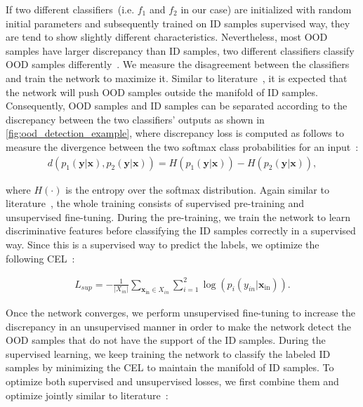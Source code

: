 \hspace*{3.5mm} If two different classifiers~(i.e. $f_{1}$ and $f_{2}$ in our case) are initialized with random initial parameters and subsequently trained on ID samples supervised way, they are tend to show slightly different characteristics. Nevertheless, most OOD samples have larger discrepancy than ID samples, two different classifiers classify OOD samples differently~\cite{OOD19}. 
We measure the disagreement between the classifiers and train the network to maximize it. Similar to literature~\cite{OOD19}, it is expected that the network will push OOD samples outside the manifold of ID samples. Consequently, OOD samples and ID samples can be separated according to the discrepancy between the two classifiers’ outputs as shown in \cref{fig:ood_detection_example}, where discrepancy loss is computed as follows to measure the divergence between the two softmax class probabilities for an input~\cite{OOD19}: 
\vspace{-2mm}
\begin{align}
    d\left(p_{1}(\mathbf{y} | \mathbf{x}), p_{2}(\mathbf{y} | \mathbf{x})\right)=H\left(p_{1}(\mathbf{y} | \mathbf{x})\right)-H\left(p_{2}(\mathbf{y} | \mathbf{x})\right),
    \label{eq:dis_loss_1}
\end{align}

\hspace*{3.5mm} where $H(\cdot)$ is the entropy over the softmax distribution. Again similar to literature~\cite{yu2019unsupervised}, the whole training consists of supervised pre-training and unsupervised fine-tuning. During the pre-training, we train the network to learn discriminative features before classifying the ID samples correctly in a supervised way. Since this is a supervised way to predict the labels, we optimize the following CEL~\cite{yu2019unsupervised}:

\vspace{-2mm}
\begin{align}
    {L}_{sup}=-\frac{1}{\left|X_{i n}\right|} \sum_{\mathbf{x}_{\mathrm{in}} \in X_{i n}} \sum_{i=1}^{2} \log \left(p_{i}\left(y_{i n} | \mathbf{x}_{\mathrm{in}}\right)\right).
\end{align}

\hspace*{3.5mm} Once the network converges, we perform unsupervised fine-tuning to increase the discrepancy in an unsupervised manner in order to make the network detect the OOD samples that do not have the support of the ID samples. During the supervised learning, we keep training the network to classify the labeled ID samples by minimizing the CEL to maintain the manifold of ID samples. To optimize both supervised and unsupervised losses, we first combine them and optimize jointly similar to literature~\cite{yu2019unsupervised}: 

